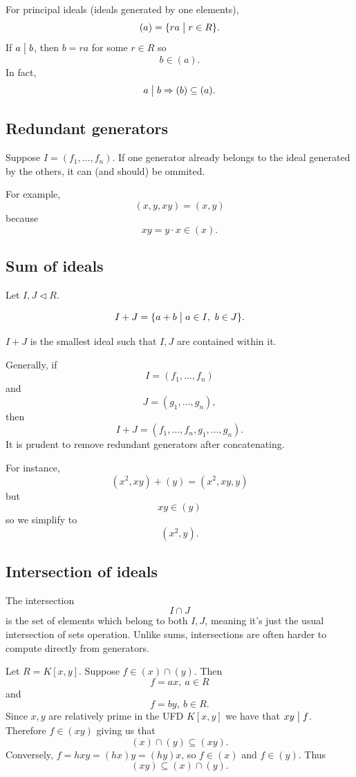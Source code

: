 \documentclass[11pt]{article}
\begin{document}
For principal ideals (ideals generated by one elements), 
\[
    (a) = \{ra \bigm| r \in R\}. 
\]
If $a \bigm| b$, then $b = ra$ for some $r \in R$ so 
\[
    b \in (a). 
\]
In fact, 
\[
    a \bigm| b \Rightarrow (b) \subseteq (a).
\]

\subsection{Redundant generators}

Suppose $I = (f_1,\ldots,f_n)$. If one generator already 
belongs to the ideal generated by the others, it can (and should) 
be ommited. 

For example, 
\[
    (x,y,xy) = (x,y)
\]
because 
\[
    xy = y \cdot x \in (x).
\]

\subsection{Sum of ideals}
Let $I, J \triangleleft R$. 

\begin{defn}
    \[
        I + J 
        = 
        \{a+b \bigm| a \in I, \ b \in J\}.
    \]
\end{defn}
$I+J$ is the smallest ideal such that $I, J$ are contained within it.

Generally, if 
\[
    I = (f_1,\ldots,f_n)
\]
and 
\[
    J = (g_1,\ldots,g_n), 
\]
then 
\[
    I + J = (f_1,\ldots,f_n, g_1,\ldots,g_n).
\]
It is prudent to remove redundant generators after concatenating. 

For instance, 
\[
    (x^2, xy) + (y) = (x^2, xy, y)
\]
but 
\[
    xy \in (y)
\]
so we simplify to 
\[
    (x^2, y).
\]

\subsection{Intersection of ideals}
The intersection 
\[
    I \cap J
\]
is the set of elements which belong to both $I,J$, meaning 
it's just the usual intersection of sets operation. 
Unlike sums, intersections are often harder to compute directly 
from generators. 

Let $R = K[x,y]$. Suppose $f \in (x) \cap (y)$. Then 
\[
    f = ax, \ a \in R
\]
and 
\[
    f = by, \ b \in R.
\]
Since $x,y$ are relatively prime in the UFD $K[x,y]$ we have 
that $xy \bigm| f$. Therefore $f \in (xy)$ giving us that 
\[
    (x) \cap (y) \subseteq (xy). 
\]
Conversely, $f = hxy = (hx)y = (hy)x$, so $f \in (x)$ and $f \in (y)$.
Thus 
\[
    (xy) \subseteq (x) \cap (y).
\]
\end{document}
